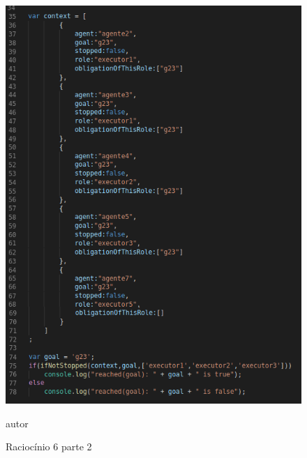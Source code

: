 \begin{figure}[H]
  \centering
  \caption{Raciocínio 6 parte 2}
  \includegraphics[width=0.8\linewidth]{figure/algjs2} 
  \begin{center}
  	autor
  \end{center}
  \label{atividiagram2}
\end{figure}